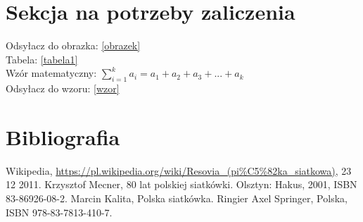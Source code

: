 \documentclass{article}
\begin{document}
\section{Sekcja na potrzeby zaliczenia}
Odsyłacz do obrazka: \ref{obrazek} \\
Tabela: \ref{tabela1} \\
\label{wzor}
Wzór matematyczny:
$\sum_{i=1}^k a_{i} = a_{1} + a_{2} + a_{3} + ... + a_{k}$ \\
Odsyłacz do wzoru: \ref{wzor}



\cleardoublepage %
\renewcommand*{\refname}{}
\section{Bibliografia} 
\begin{thebibliography}{9}

Wikipedia, \url{https://pl.wikipedia.org/wiki/Resovia_(pi%C5%82ka_siatkowa)}, 23 12 2011.
  Krzysztof Mecner,
  80 lat polskiej siatkówki.
  Olsztyn: Hakus,
  2001,
  ISBN 83-86926-08-2.
  Marcin Kalita,
  Polska siatkówka.
  Ringier Axel Springer,
  Polska,
 ISBN 978-83-7813-410-7.
\end{thebibliography}
\end{document}
